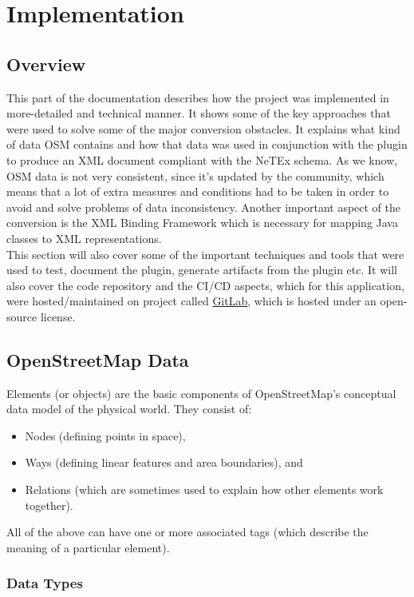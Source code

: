 \chapter{Implementation}
\section{Overview}
This part of the documentation describes how the project was implemented in more-detailed and technical manner. It shows some of the key approaches that were used to solve some of the major conversion obstacles. It explains what kind of data OSM contains and how that data was used in conjunction with the plugin to produce an XML document compliant with the NeTEx schema. As we know, OSM data is not very consistent, since it's updated by the community, which means that a lot of extra measures and conditions had to be taken in order to avoid and solve problems of data inconsistency. Another important aspect of the conversion is the XML Binding Framework which is necessary for mapping Java classes to XML representations.\\
This section will also cover some of the important techniques and tools that were used to test, document the plugin, generate artifacts from the plugin etc. It will also cover the code repository and the CI/CD aspects, which for this application, were hosted/maintained on project called \href{https://gitlab.com/}{GitLab}, which is hosted under an open-source license.
\section{OpenStreetMap Data}
Elements (or objects) are the basic components of OpenStreetMap's conceptual data model of the physical world. They consist of:
\begin{itemize}
	\item Nodes (defining points in space),
	\item Ways (defining linear features and area boundaries), and
	\item Relations (which are sometimes used to explain how other elements work together).
\end{itemize}
All of the above can have one or more associated tags (which describe the meaning of a particular element). \cite{OSMElements}
\subsection{Data Types}
\label{sec:OSMDataTypes}
